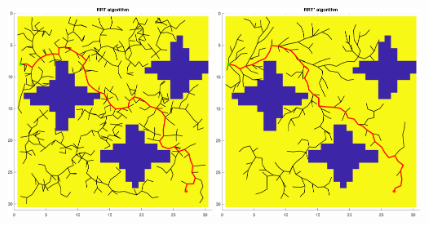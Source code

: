 \begin{figure}[H]
    \centering
    \includegraphics[width=0.48\textwidth]{./img/MATLAB/testing/02_RRT.pdf}
    \hspace{6pt}
    \includegraphics[width=0.48\textwidth]{./img/MATLAB/testing/02_RRT Star.pdf}

    \vspace{11pt}


\end{figure}
